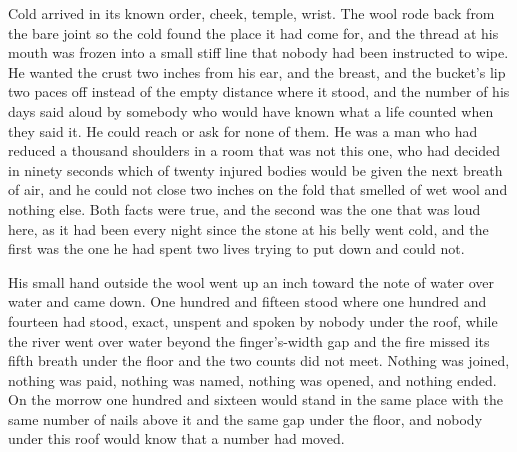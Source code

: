 Cold arrived in its known order, cheek, temple, wrist. The wool rode back from the bare joint so the cold found the place it had come for, and the thread at his mouth was frozen into a small stiff line that nobody had been instructed to wipe. He wanted the crust two inches from his ear, and the breast, and the bucket's lip two paces off instead of the empty distance where it stood, and the number of his days said aloud by somebody who would have known what a life counted when they said it. He could reach or ask for none of them. He was a man who had reduced a thousand shoulders in a room that was not this one, who had decided in ninety seconds which of twenty injured bodies would be given the next breath of air, and he could not close two inches on the fold that smelled of wet wool and nothing else. Both facts were true, and the second was the one that was loud here, as it had been every night since the stone at his belly went cold, and the first was the one he had spent two lives trying to put down and could not.

His small hand outside the wool went up an inch toward the note of water over water and came down. One hundred and fifteen stood where one hundred and fourteen had stood, exact, unspent and spoken by nobody under the roof, while the river went over water beyond the finger's-width gap and the fire missed its fifth breath under the floor and the two counts did not meet. Nothing was joined, nothing was paid, nothing was named, nothing was opened, and nothing ended. On the morrow one hundred and sixteen would stand in the same place with the same number of nails above it and the same gap under the floor, and nobody under this roof would know that a number had moved.
